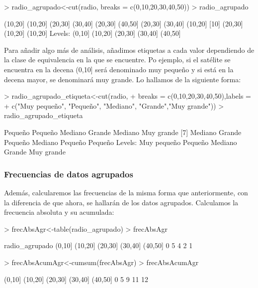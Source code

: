 \documentclass [a4paper] {article}
\begin{document}
\begin{Schunk}
\begin{Sinput}
> radio_agrupado<-cut(radio, breaks = c(0,10,20,30,40,50))
> radio_agrupado
\end{Sinput}
\begin{Soutput}
 [1] (10,20] (10,20] (20,30] (30,40] (20,30] (40,50] (20,30] (30,40] (10,20]
[10] (20,30] (10,20] (10,20]
Levels: (0,10] (10,20] (20,30] (30,40] (40,50]
\end{Soutput}
\end{Schunk}

Para añadir algo más de análisis, añadimos etiquetas a cada valor dependiendo de la clase de equivalencia en la que se encuentre.
Po ejemplo, si el satélite se encuentra en la decena (0,10] será denominado muy pequeño y si está en la decena mayor,
se denominará muy grande. Lo hallamos de la siguiente forma:

\begin{Schunk}
\begin{Sinput}
> radio_agrupado_etiqueta<-cut(radio, 
+ breaks = c(0,10,20,30,40,50),labels = 
+ c("Muy pequeño", "Pequeño", "Mediano", "Grande","Muy grande"))
> radio_agrupado_etiqueta
\end{Sinput}
\begin{Soutput}
 [1] Pequeño    Pequeño    Mediano    Grande     Mediano    Muy grande
 [7] Mediano    Grande     Pequeño    Mediano    Pequeño    Pequeño   
Levels: Muy pequeño Pequeño Mediano Grande Muy grande
\end{Soutput}
\end{Schunk}


\subsubsection{Frecuencias de datos agrupados}
Además, calcularemos las frecuencias de la misma forma que anteriormente, con la diferencia de que ahora, se hallarán
de los datos agrupados. Calculamos la frecuencia absoluta y su acumulada:

\begin{Schunk}
\begin{Sinput}
> frecAbsAgr<-table(radio_agrupado)
> frecAbsAgr
\end{Sinput}
\begin{Soutput}
radio_agrupado
 (0,10] (10,20] (20,30] (30,40] (40,50] 
      0       5       4       2       1 
\end{Soutput}
\begin{Sinput}
> frecAbsAcumAgr<-cumsum(frecAbsAgr)
> frecAbsAcumAgr
\end{Sinput}
\begin{Soutput}
 (0,10] (10,20] (20,30] (30,40] (40,50] 
      0       5       9      11      12 
\end{Soutput}
\end{Schunk}
\end{document}
